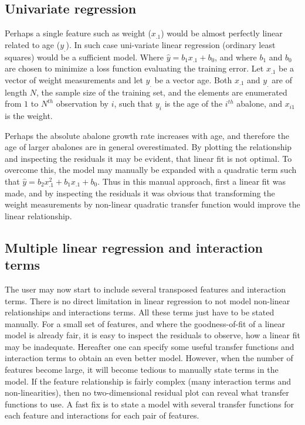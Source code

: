\subsection{Univariate regression}
Perhaps a single feature such as weight ($x_{.1}$) would be almost perfectly linear related to age ($y_.$). In such case uni-variate linear regression (ordinary least squares) would be a sufficient model. Where $\hat{y} = b_1 x_{.1} + b_0$, and where $b_1$ and $b_0$ are chosen to minimize a loss function evaluating the training error. Let $x_{.1}$ be a vector of weight measurements and let $y_.$ be a vector age. Both $x_.1$ and $y_.$ are of length $N$, the sample size of the training set, and the elements are enumerated from $1$ to $N^{th}$ observation by $i$, such that $y_i$ is the age of the $i^{th}$ abalone, and $x_{i1}$ is the weight.

Perhaps the absolute abalone growth rate increases with age, and therefore the age of larger abalones are in general overestimated. By plotting the relationship and inspecting the residuals it may be evident, that linear fit is not optimal. To overcome this, the model may manually be expanded with a quadratic term such that $\hat{y} = b_2 x_{.1}^2 + b_1 x_{.1} + b_0$.  Thus in this manual approach, first a linear fit was made, and by inspecting the residuals it was obvious that transforming the weight measurements by non-linear quadratic transfer function would improve the linear relationship.

\subsection{Multiple linear regression and interaction terms}
The user may now start to include several transposed features and interaction terms. There is no direct limitation in linear regression to not model non-linear relationships and interactions terms. All these terms just have to be stated manually. For a small set of features, and where the goodness-of-fit of a linear model is already fair, it is easy to inspect the residuals to observe, how a linear fit may be inadequate. Hereafter one can specify some useful transfer functions and interaction terms to obtain an even better model. However, when the number of features become large, it will become tedious to manually state terms in the model. If the feature relationship is fairly complex (many interaction terms and non-linearities), then no two-dimensional residual plot can reveal what transfer functions to use. A fast fix is to state a model with several transfer functions for each feature and interactions for each pair of features.

